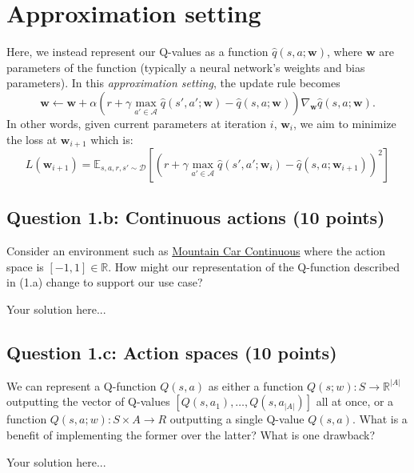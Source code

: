 \documentclass[12pt]{article}
\begin{document}
\section*{Approximation setting}
Here, we instead represent our Q-values as a function $\hat{q}(s,a;\mathbf{w})$, where $\mathbf{w}$ are parameters of the function (typically a neural network's weights and bias parameters). In this \textit{approximation setting}, the update rule becomes
\begin{equation}
\mathbf{w} \leftarrow \mathbf{w} + \alpha \left( r + \gamma \max_{a' \in \mathcal{A}} \hat{q}(s',a';\mathbf{w}) - \hat{q}(s,a;\mathbf{w}) \right) \nabla_{\mathbf{w}}\hat{q}(s,a;\mathbf{w}).
\end{equation}
In other words, given current parameters at iteration $i$, $\mathbf{w}_i$, we aim to minimize the loss at $\mathbf{w}_{i+1}$ which is:
\begin{equation}
L(\mathbf{w}_{i+1}) = \mathbb{E}_{s,a,r,s' \sim \mathcal{D}} \left[ \left( r + \gamma \max_{a' \in \mathcal{A}} \hat{q}(s',a';\mathbf{w}_{i}) - \hat{q}(s,a;\mathbf{w}_{i+1}) \right)^2 \right]
\end{equation}

\subsection*{Question 1.b: Continuous actions (10 points)}
Consider an environment such as \href{https://www.gymlibrary.dev/environments/classic_control/mountain_car_continuous/}{Mountain Car Continuous} where the action space is $[-1,1] \in \mathbb{R}$. How might our representation of the Q-function described in (1.a) change to support our use case?
\begin{solution}
Your solution here...
\end{solution}

\subsection*{Question 1.c: Action spaces (10 points)}
We can represent a Q-function $Q(s, a)$ as either a function $Q(s; w): S \rightarrow \mathbb{R}^{|A|}$ outputting the vector of Q-values $[Q(s, a_1), …, Q(s, a_{|A|})]$ all at once, or a function $Q(s, a; w): S \times A \rightarrow R$ outputting a single Q-value $Q(s, a)$. What is a benefit of implementing the former over the latter? What is one drawback?
\begin{solution}
Your solution here...
\end{solution}
\end{document}
